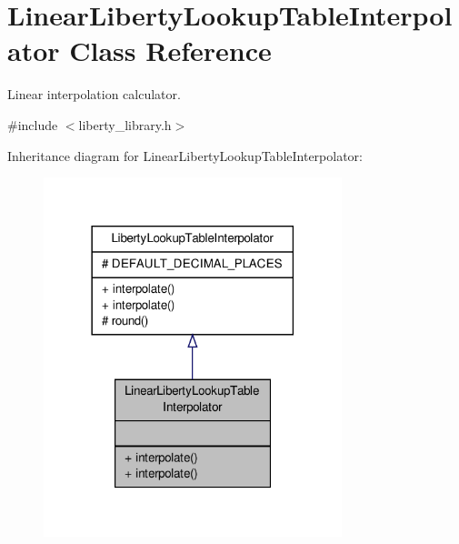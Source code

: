 \hypertarget{classLinearLibertyLookupTableInterpolator}{\section{Linear\-Liberty\-Lookup\-Table\-Interpolator Class Reference}
\label{classLinearLibertyLookupTableInterpolator}
}


Linear interpolation calculator.  




{\ttfamily \#include $<$liberty\-\_\-library.\-h$>$}



Inheritance diagram for Linear\-Liberty\-Lookup\-Table\-Interpolator\-:\nopagebreak
\begin{figure}[H]
\begin{center}
\leavevmode
\includegraphics[width=246pt]{classLinearLibertyLookupTableInterpolator__inherit__graph}
\end{center}
\end{figure}


